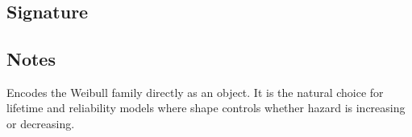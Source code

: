 \documentclass[letterpaper,10pt,english]{sphinxmanual}
\begin{document}
\section{}
\label{\detokenize{object_api_reference:weibull}}

\subsection{Signature}
\label{\detokenize{object_api_reference:id52}}
\begin{sphinxVerbatim}[commandchars=\\\{\}]

\end{sphinxVerbatim}


\subsection{Notes}
\label{\detokenize{object_api_reference:id53}}
\sphinxAtStartPar
Encodes the Weibull family directly as an object. It is the natural choice for lifetime and reliability models where shape controls whether hazard is increasing or decreasing.
\end{document}
